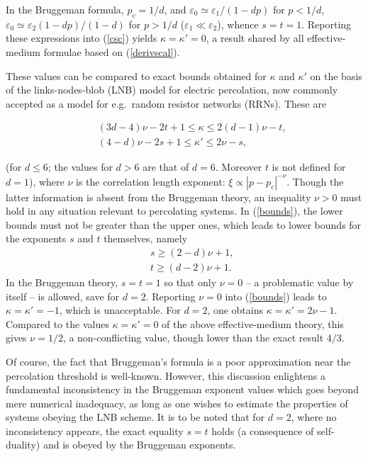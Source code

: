In the Bruggeman formula, $p_c=1/d$, and $\varepsilon_0
\simeq\varepsilon_1/(1-dp)$ for $p<1/d$, $\varepsilon_0
\simeq\varepsilon_2(1-dp)/(1-d)$ for $p>1/d$ 
($\varepsilon_1\ll \varepsilon_2$), whence $s=t=1$. 
Reporting these expressions into (\ref{csc}) yields 
$\kappa=\kappa'=0$, a result shared by all 
effective-medium formulae based on (\ref{derivscal}). 

These values can be compared to exact bounds obtained 
for $\kappa$ and $\kappa'$ on the basis of the 
links-nodes-blob (LNB) model for electric percolation, 
now commonly accepted as a model for e.g.\ random 
resistor networks (RRNs). These are \cite{WRIG86}
\begin{mathletters}
\label{bounds}
\begin{eqnarray}
&&(3d-4)\nu-2t+1\le \kappa\le 2(d-1)\nu-t,\\
&&(4-d)\nu-2s+1\le\kappa'\le 2\nu-s,
\end{eqnarray}
\end{mathletters}
(for $d\le 6$; the values for $d>6$ are that of $d=6$. 
Moreover $t$ is not defined for $d=1$), where $\nu$ is 
the correlation length exponent: $\xi\propto |p-p_c|^{-\nu}$. 
Though the latter information is absent from the Bruggeman 
theory, an inequality $\nu>0$ must hold in any situation 
relevant to percolating systems. In (\ref{bounds}), the 
lower bounds must not be greater than the upper ones, 
which leads to lower bounds for the exponents $s$ and 
$t$ themselves, namely
\begin{eqnarray}
&&s\ge (2-d)\nu+1,\\
&&t\ge (d-2)\nu+1.
\end{eqnarray}
In the Bruggeman theory, $s=t=1$ so that only $\nu=0$ 
-- a problematic value by itself -- is allowed, save for 
$d=2$. Reporting $\nu=0$ into (\ref{bounds}) leads to 
$\kappa=\kappa'=-1$, which is unacceptable. For $d=2$, 
one obtains $\kappa=\kappa'=2\nu-1$. Compared to the 
values $\kappa=\kappa'=0$ of the above effective-medium 
theory, this gives $\nu=1/2$, a non-conflicting value, 
though lower than the exact result $4/3$. 

Of course, the fact that Bruggeman's formula is a poor 
approximation near the percolation threshold is well-known. 
However, this discussion enlightens a fundamental 
inconsistency in the Bruggeman exponent values which 
goes beyond mere numerical inadequacy, as long as one
 wishes to estimate the properties of systems obeying 
the LNB scheme. It is to be noted that for $d=2$, where
 no inconsistency appears, the exact equality $s=t$ holds 
(a consequence of self-duality) \cite{STRA77} and is obeyed 
by the Bruggeman exponents. 

